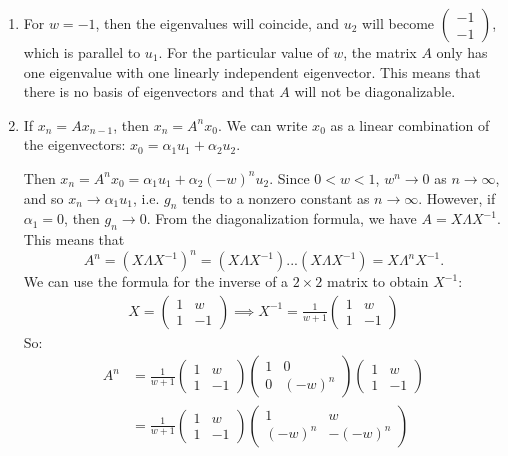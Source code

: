 \documentclass[11pt]{article}
\begin{document}
\begin{enumerate}
\item For $w = -1$, then the eigenvalues will coincide, and $u_2$ will become $\begin{pmatrix} -1 \\ -1 \end{pmatrix}$, which is parallel to $u_1$. For the particular value of $w$, the matrix $A$ only has one eigenvalue with one linearly independent eigenvector. This means that there is no basis of eigenvectors and that $A$ will not be diagonalizable. 

\item If $x_n = Ax_{n-1}$, then $x_n = A^n x_0$. We can write $x_0$ as a linear combination of the eigenvectors: $x_0 = \alpha_1 u_1 + \alpha_2 u_2$. 

Then $x_n = A^n x_0 = \alpha_1 u_1 + \alpha_2 (-w)^n u_2$. Since $0<w<1$, $w^n \to 0$ as $n \to \infty$, and so $x_n \to \alpha_1 u_1$, i.e. $g_n$ tends to a nonzero constant as $n\to \infty$. However, if $\alpha_1 = 0$, then $g_n \to 0$. From the diagonalization formula, we have $A=X\Lambda X^{-1}$. This means that 
$$A^n = (X\Lambda X^{-1})^n = (X\Lambda X^{-1})...(X\Lambda X^{-1}) = X\Lambda^n X^{-1}.$$
We can use the formula for the inverse of a $2\times 2$ matrix to obtain $X^{-1}$:
\begin{align}
X = \begin{pmatrix} 1 & w \\ 1 & -1 \end{pmatrix} \implies X^{-1} = \frac{1}{w+1}\begin{pmatrix} 1 & w \\ 1 & -1 \end{pmatrix}
\end{align}
So:
\begin{align}
A^n &= \frac{1}{w+1} \begin{pmatrix} 1 & w \\ 1 & -1 \end{pmatrix}  \begin{pmatrix} 1 & 0 \\ 0 & (-w)^n \end{pmatrix} \begin{pmatrix} 1 & w \\ 1 & -1 \end{pmatrix}\\
&= \frac{1}{w+1} \begin{pmatrix} 1 & w \\ 1 & -1 \end{pmatrix}\begin{pmatrix} 1 & w \\ (-w)^n & -(-w)^n \end{pmatrix}\\

\end{align}
\end{enumerate}
\end{document}
